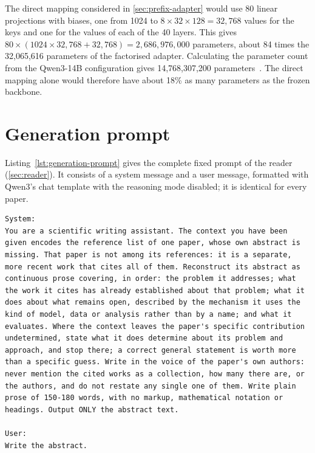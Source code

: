 The direct mapping considered in \autoref{sec:prefix-adapter} would use 80 linear projections with biases, one from 1024 to $8 \times 32 \times 128 = 32{,}768$ values for the keys and one for the values of each of the 40 layers. This gives $80 \times (1024 \times 32{,}768 + 32{,}768) = 2{,}686{,}976{,}000$ parameters, about 84 times the 32,065,616 parameters of the factorised adapter. Calculating the parameter count from the Qwen3-14B configuration gives 14,768,307,200 parameters~\cite{qwen2025config}. The direct mapping alone would therefore have about 18\% as many parameters as the frozen backbone.

\section{Generation prompt}
\label{app:generation-prompt}

Listing~\ref{lst:generation-prompt} gives the complete fixed prompt of the reader (\autoref{sec:reader}). It consists of a system message and a user message, formatted with Qwen3's chat template with the reasoning mode disabled; it is identical for every paper.

\begin{lstlisting}[caption={Fixed prompt of the reader.},label={lst:generation-prompt}]
System:
You are a scientific writing assistant. The context you have been given encodes the reference list of one paper, whose own abstract is missing. That paper is not among its references: it is a separate, more recent work that cites all of them. Reconstruct its abstract as continuous prose covering, in order: the problem it addresses; what the work it cites has already established about that problem; what it does about what remains open, described by the mechanism it uses the kind of model, data or analysis rather than by a name; and what it evaluates. Where the context leaves the paper's specific contribution undetermined, state what it does determine about its problem and approach, and stop there; a correct general statement is worth more than a specific guess. Write in the voice of the paper's own authors: never mention the cited works as a collection, how many there are, or the authors, and do not restate any single one of them. Write plain prose of 150-180 words, with no markup, mathematical notation or headings. Output ONLY the abstract text.

User:
Write the abstract.
\end{lstlisting}

